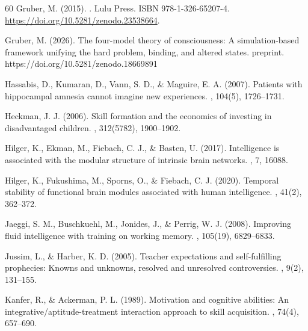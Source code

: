 \documentclass[12pt,a4paper]{article}
\begin{document}
\begin{thebibliography}{60}
Gruber, M. (2015).
.
\newblock Lulu Press. ISBN 978-1-326-65207-4. \url{https://doi.org/10.5281/zenodo.23538664}.

Gruber, M. (2026).
\newblock The four-model theory of consciousness: A simulation-based framework unifying the hard problem, binding, and altered states.
 preprint. https://doi.org/10.5281/zenodo.18669891

Hassabis, D., Kumaran, D., Vann, S. D., \& Maguire, E. A. (2007).
\newblock Patients with hippocampal amnesia cannot imagine new experiences.
, 104(5), 1726--1731.

Heckman, J. J. (2006).
\newblock Skill formation and the economics of investing in disadvantaged children.
, 312(5782), 1900--1902.

Hilger, K., Ekman, M., Fiebach, C. J., \& Basten, U. (2017).
\newblock Intelligence is associated with the modular structure of intrinsic brain networks.
, 7, 16088.

Hilger, K., Fukushima, M., Sporns, O., \& Fiebach, C. J. (2020).
\newblock Temporal stability of functional brain modules associated with human intelligence.
, 41(2), 362--372.

Jaeggi, S. M., Buschkuehl, M., Jonides, J., \& Perrig, W. J. (2008).
\newblock Improving fluid intelligence with training on working memory.
, 105(19), 6829--6833.

Jussim, L., \& Harber, K. D. (2005).
\newblock Teacher expectations and self-fulfilling prophecies: Knowns and unknowns, resolved and unresolved controversies.
, 9(2), 131--155.

Kanfer, R., \& Ackerman, P. L. (1989).
\newblock Motivation and cognitive abilities: An integrative/aptitude-treatment interaction approach to skill acquisition.
, 74(4), 657--690.


\end{thebibliography}
\end{document}
